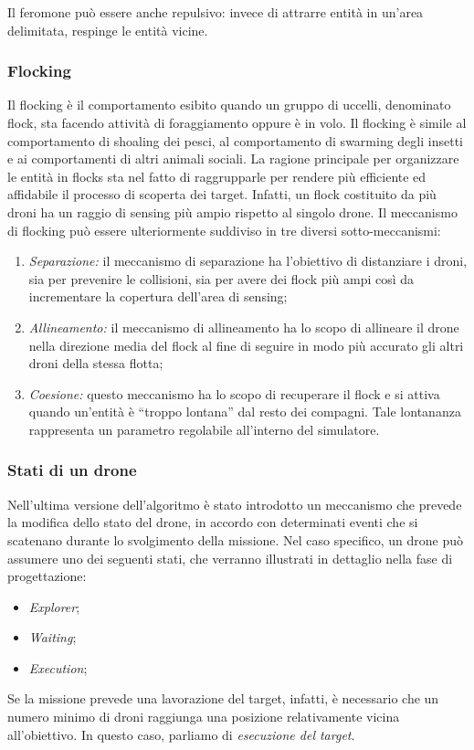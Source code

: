 Il feromone può essere anche repulsivo: invece di attrarre entità in un’area delimitata, respinge le entità vicine.

\subsubsection{Flocking}

Il flocking è il comportamento esibito quando un gruppo di uccelli, denominato flock, sta facendo attività di foraggiamento oppure è in volo. 
Il flocking è simile al comportamento di shoaling dei pesci, al comportamento di swarming degli insetti e ai comportamenti di altri animali sociali. 
La ragione principale per organizzare le entità in flocks sta nel fatto di raggrupparle per rendere più efficiente ed affidabile il processo di scoperta dei target. 
Infatti, un flock costituito da più droni ha un raggio di sensing più ampio rispetto al singolo drone. 
Il meccanismo di flocking può essere ulteriormente suddiviso in tre diversi sotto-meccanismi:

\begin{enumerate}
    \item \textit{Separazione:} il meccanismo di separazione ha l'obiettivo di distanziare i droni, sia per prevenire le collisioni, sia per avere dei flock più ampi così da incrementare la copertura dell'area di sensing;
    \item \textit{Allineamento:} il meccanismo di allineamento ha lo scopo di allineare il drone nella direzione media del flock al fine di seguire in modo più accurato gli altri droni della stessa flotta;
    \item \textit{Coesione:} questo meccanismo ha lo scopo di recuperare il flock e si attiva quando un’entità è “troppo lontana” dal resto dei compagni. 
    Tale lontananza rappresenta un parametro regolabile all'interno del simulatore.
\end{enumerate}

\subsubsection{Stati di un drone}

Nell'ultima versione dell'algoritmo è stato introdotto un meccanismo che prevede la modifica dello stato del drone, in accordo con determinati eventi che si scatenano durante lo svolgimento della missione.
Nel caso specifico, un drone può assumere uno dei seguenti stati, che verranno illustrati in dettaglio nella fase di progettazione:
\begin{itemize}
    \item \textit{Explorer};
    \item \textit{Waiting};
    \item \textit{Execution};
\end{itemize}
Se la missione prevede una lavorazione del target, infatti, è necessario che un numero minimo di droni raggiunga una posizione relativamente vicina all'obiettivo.
In questo caso, parliamo di \textit{esecuzione del target}.

